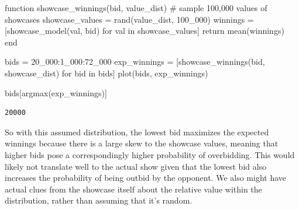 \documentclass[
  letterpaper,
  DIV=11,
  numbers=noendperiod]{scrartcl}
\newenvironment{Shaded}{\begin{snugshade}}{\end{snugshade}}
\newcommand{\CommentTok}[1]{\textcolor[rgb]{0.37,0.37,0.37}{#1}}
\newcommand{\ControlFlowTok}[1]{\textcolor[rgb]{0.00,0.23,0.31}{#1}}
\newcommand{\FloatTok}[1]{\textcolor[rgb]{0.68,0.00,0.00}{#1}}
\newcommand{\FunctionTok}[1]{\textcolor[rgb]{0.28,0.35,0.67}{#1}}
\newcommand{\KeywordTok}[1]{\textcolor[rgb]{0.00,0.23,0.31}{#1}}
\newcommand{\NormalTok}[1]{\textcolor[rgb]{0.00,0.23,0.31}{#1}}
\newcommand{\OperatorTok}[1]{\textcolor[rgb]{0.37,0.37,0.37}{#1}}
\begin{document}
\begin{Shaded}
\begin{Highlighting}[]
\KeywordTok{function} \FunctionTok{showcase\_winnings}\NormalTok{(bid, value\_dist)}
    \CommentTok{\# sample 100,000 values of showcases}
\NormalTok{    showcase\_values }\OperatorTok{=} \FunctionTok{rand}\NormalTok{(value\_dist, }\FloatTok{100\_000}\NormalTok{)}
\NormalTok{    winnings }\OperatorTok{=}\NormalTok{ [}\FunctionTok{showcase\_model}\NormalTok{(val, bid) for val }\KeywordTok{in}\NormalTok{ showcase\_values]}
    \ControlFlowTok{return} \FunctionTok{mean}\NormalTok{(winnings)}
\KeywordTok{end}

\NormalTok{bids }\OperatorTok{=} \FloatTok{20\_000}\OperatorTok{:}\FloatTok{1\_000}\OperatorTok{:}\FloatTok{72\_000}
\NormalTok{exp\_winnings }\OperatorTok{=}\NormalTok{ [}\FunctionTok{showcase\_winnings}\NormalTok{(bid, showcase\_dist) for bid }\KeywordTok{in}\NormalTok{ bids]}
\FunctionTok{plot}\NormalTok{(bids, exp\_winnings)}
\end{Highlighting}
\end{Shaded}

\begin{figure}[H]


\end{figure}%

\begin{Shaded}
\begin{Highlighting}[]
\NormalTok{bids[}\FunctionTok{argmax}\NormalTok{(exp\_winnings)]}
\end{Highlighting}
\end{Shaded}

\begin{verbatim}
20000
\end{verbatim}

So with this assumed distribution, the lowest bid maximizes the expected
winnings because there is a large skew to the showcase values, meaning
that higher bids pose a correspondingly higher probability of
overbidding. This would likely not translate well to the actual show
given that the lowest bid also increases the probability of being outbid
by the opponent. We also might have actual clues from the showcase
itself about the relative value within the distribution, rather than
assuming that it's random.
\end{document}
